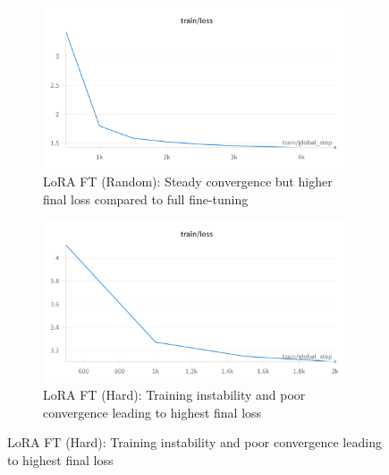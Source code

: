 \begin{figure}[t]
\centering
\begin{subfigure}{0.48\textwidth}
\includegraphics[width=\textwidth]{lora_finetuned_1million.png}
\caption{LoRA FT (Random): Steady convergence but higher final loss compared to full fine-tuning}
\end{subfigure}
\hfill
\begin{subfigure}{0.48\textwidth}
\includegraphics[width=\textwidth]{lora_finetuned_hard_negatives.png}
\caption{LoRA FT (Hard): Training instability and poor convergence leading to highest final loss}
\end{subfigure}


\end{figure}
